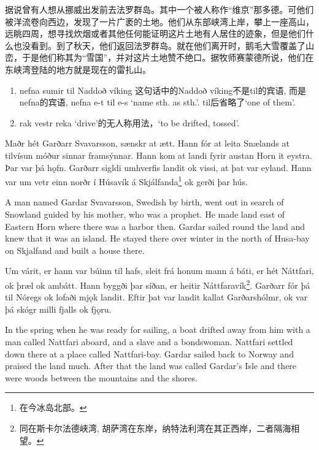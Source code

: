 \begin{translation*}{}
    据说曾有人想从挪威出发前去法罗群岛。其中一个被人称作“维京”那多德。可他们被洋流卷向西边，发现了一片广袤的土地。他们从东部峡湾上岸，攀上一座高山，远眺四周，想寻找炊烟或者其他任何能证明这片土地有人居住的迹象，但是他们什么也没看到。到了秋天，他们返回法罗群岛。就在他们离开时，鹅毛大雪覆盖了山峦，于是他们称其为“雪国”，并对这片土地赞不绝口。据牧师赛蒙德所说，他们在东峡湾登陆的地方就是现在的雷扎山。
\end{translation*}
\begin{grammar*}{}
    \begin{enumerate}[leftmargin=*]
        \item nefna sumir til Naddoð víking
              这句话中的Naddoð víking不是til的宾语, 而是nefna的宾语, nefna e-t til e-s `name sth. as sth.'. til后省略了`one of them'.
        \item rak vestr
              reka `drive'的无人称用法，`to be drifted, tossed'.
    \end{enumerate}
\end{grammar*}
\begin{paracol}{2}
    Maðr hét Garðarr Svavarsson, sænskr at ætt. Hann fór at leita Snælands at tilvísun móður sinnar framsýnnar. Hann kom at landi fyrir austan Horn it eystra. Þar var þá hǫfn. Garðarr sigldi umhverfis landit ok vissi, at þat var eyland. Hann var um vetr einn norðr í Húsavík á Skjálfanda\footnote{在今冰岛北部。} ok gerði þar hús.

    \switchcolumn

    A man named Gardar Svavarsson, Swedish by birth, went out in search of Snowland guided by his mother, who was a prophet. He made land east of Eastern Horn where there was a harbor then. Gardar sailed round the land and knew that it was an island. He stayed there over winter in the north of Husa-bay on Skjalfand and built a house there.

    \switchcolumn*

    Um várit, er hann var búinn til hafs, sleit frá honum mann á báti, er hét Náttfari, ok þræl ok ambátt. Hann byggði þar síðan, er heitir Náttfaravík\footnote{同在斯卡尔法德峡湾, 胡萨湾在东岸，纳特法利湾在其正西岸，二者隔海相望。}. Garðarr fór þá til Nóregs ok lofaði mjǫk landit. Eftir þat var landit kallat Garðarshólmr, ok var þá skógr milli fjalls ok fjǫru.

    \switchcolumn

    In the spring when he was ready for sailing, a boat drifted away from him with a man called Nattfari aboard, and a slave and a bondswoman. Nattfari settled down there at a place called Nattfari-bay. Gardar sailed back to Norway and praised the land much. After that the land was called Gardar's Isle and there were woods between the mountains and the shores.
\end{paracol}
